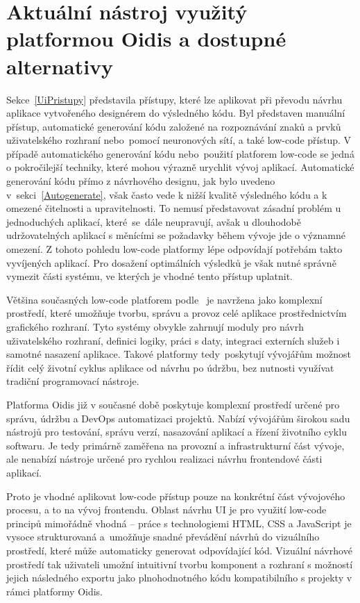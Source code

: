 \section{Aktuální nástroj využitý platformou Oidis a dostupné alternativy}
\label{AktualniNastroje}
Sekce~\ref{UiPristupy} představila přístupy, které lze aplikovat při převodu návrhu aplikace vytvořeného designérem do výsledného kódu. Byl představen manuální přístup, automatické generování kódu založené na rozpoznávání znaků a prvků uživatelského rozhraní nebo~pomocí neuronových sítí, a také low-code přístup. V případě automatického generování kódu nebo~použití platforem low-code se jedná o pokročilejší techniky, které mohou výrazně urychlit vývoj aplikací. Automatické generování kódu přímo z návrhového designu, jak bylo uvedeno v~sekci~\ref{Autogenerate}, však často vede k nižší kvalitě výsledného kódu a k omezené čitelnosti a upravitelnosti. To nemusí představovat zásadní problém u jednoduchých aplikací, které~se~dále neupravují, avšak u dlouhodobě udržovatelných aplikací s měnícími se požadavky během vývoje jde o významné omezení. Z tohoto pohledu low-code platformy lépe odpovídají potřebám takto vyvíjených aplikací. Pro dosažení optimálních výsledků je však nutné správně vymezit části systému, ve kterých je vhodné tento přístup uplatnit.

Většina současných low-code platforem podle~\cite{LowCodePlatforms} je navržena jako komplexní prostředí, které umožňuje tvorbu, správu a provoz celé aplikace prostřednictvím grafického rozhraní. Tyto systémy obvykle zahrnují moduly pro návrh uživatelského rozhraní, definici logiky, práci s daty, integraci externích služeb i samotné nasazení aplikace. Takové platformy tedy~poskytují vývojářům možnost řídit celý životní cyklus aplikace od návrhu po údržbu, bez nutnosti využívat tradiční programovací nástroje.

Platforma Oidis již v současné době poskytuje komplexní prostředí určené pro správu, údržbu a DevOps automatizaci projektů. Nabízí vývojářům širokou sadu nástrojů pro testování, správu verzí, nasazování aplikací a řízení životního cyklu softwaru. Je tedy primárně zaměřena na provozní a infrastrukturní část vývoje, ale nenabízí nástroje určené pro rychlou realizaci návrhu frontendové části aplikací.

Proto je vhodné aplikovat low-code přístup pouze na konkrétní část vývojového procesu, a to na vývoj frontendu. Oblast návrhu UI je pro využití low-code principů mimořádně vhodná -- práce s technologiemi HTML, CSS a JavaScript je vysoce strukturovaná a~umožňuje snadné převádění návrhů do vizuálního prostředí, které může automaticky generovat odpovídající kód. Vizuální návrhové prostředí tak uživateli umožní intuitivní tvorbu komponent a rozhraní s možností jejich následného exportu jako plnohodnotného kódu kompatibilního s projekty v rámci platformy Oidis.

